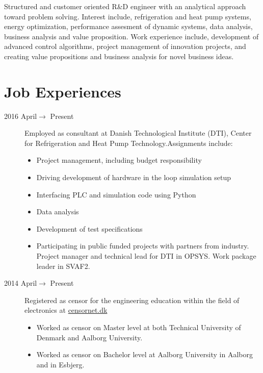 \documentclass[margin,line,a4paper]{resume}
\begin{document}
\begin{resume}
Structured and customer oriented R\&D engineer with an analytical approach toward problem solving. Interest include, refrigeration and heat pump systems, energy optimization, performance assesment of dynamic systems, data analysis, business analysis and value proposition. Work experience include, development of advanced control algorithms, project management of innovation projects, and creating value propositions and business analysis for novel business ideas.


\section{\mysidestyle Job Experiences}\vspace{1mm}
\begin{description}
\item[2016 April$\rightarrow$ Present] Employed as consultant at Danish Technological Institute (DTI), Center for Refrigeration and Heat Pump Technology.Assignments include:
\begin{itemize}
\item Project management, including budget responsibility  
\item Driving development of hardware in the loop simulation setup
\item Interfacing PLC and simulation code using Python
\item Data analysis
\item Development of test specifications
\item Participating in public funded projects with partners from industry. Project manager and technical lead for DTI in OPSYS. Work package leader in SVAF2.
\end{itemize}
   \item[2014 April$\rightarrow$ Present] Registered as censor for the engineering education within the field of electronics at \href{https://www.censornet.dk/welcome.htm}{censornet.dk}
     \begin{itemize}
     \item Worked as censor on Master level at both Technical University of Denmark and Aalborg University.
     \item Worked as censor on Bachelor level at Aalborg University in Aalborg and in Esbjerg.
     \end{itemize}


\end{description}
\end{resume}
\end{document}
